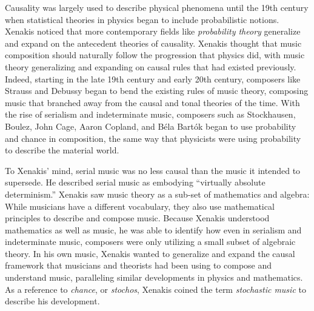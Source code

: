 Causality was largely used to describe physical phenomena until the
19th century when statistical theories in physics began to include
probabilistic notions. Xenakis
noticed that more contemporary fields like \emph{probability theory}
generalize and expand on the antecedent theories of causality. Xenakis
thought that music composition should naturally follow the progression
that physics did, with music theory generalizing and expanding on
causal rules that had existed previously. Indeed, starting in the late
19th century and early 20th century, composers like Strauss and
Debussy began to bend the existing rules of music theory, composing
music that branched away from the causal and tonal theories of the
time. With the rise of serialism  and indeterminate music,
composers such as Stockhausen, Boulez, John Cage, Aaron Copland, and
B\'{e}la Bart\'{o}k began to use probability and chance in
composition, the same way that physicists were using probability to
describe the material world. 

To Xenakis' mind, serial music was no less causal than the music it
intended to supersede. He described serial music as embodying
``virtually absolute determinism.''\cite{xenakis1992formalized}
Xenakis saw music theory as a sub-set of mathematics and algebra:
While musicians have a different vocabulary, they also use
mathematical principles to describe and compose music. Because Xenakis
understood mathematics as well as music, he was able to identify how
even in serialism and indeterminate music, composers were only
utilizing a small subset of algebraic theory. In his own music,
Xenakis wanted to generalize and expand the causal framework that
musicians and theorists had been using to compose and understand
music, paralleling similar developments in physics and
mathematics. As a reference to \emph{chance}, or \emph{stochos},
Xenakis coined the term \emph{stochastic music} to describe his
development.

